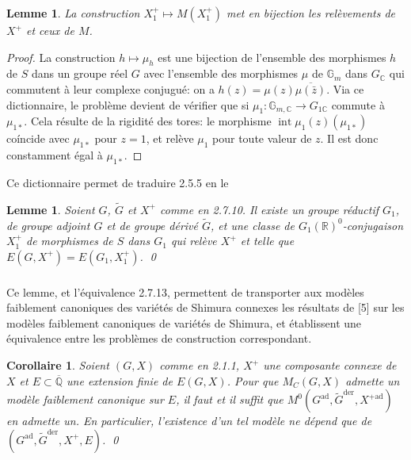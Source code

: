 \documentclass[12pt,a4paper]{article}
\theoremstyle{plain}
\newtheorem{lemma}[theorem]{Lemme}
\newtheorem{corollary}[theorem]{Corollaire}
\theoremstyle{definition}
\theoremstyle{remark}
\DeclareMathOperator{\Int}{int}
\newcommand{\QQ}{\mathbb{Q}}
\newcommand{\RR}{\mathbb{R}}
\newcommand{\CC}{\mathbb{C}}
\newcommand{\Gm}{\mathbb{G}}
\begin{document}
\begin{lemma}
La construction $X_1^+ \mapsto M(X_1^+)$ met en bijection les rel\`evements de $X^+$ et ceux de $M$.
\end{lemma}

\begin{proof}
La construction $h \mapsto \mu_h$ est une bijection de l'ensemble des morphismes $h$ de $S$ dans un groupe r\'eel $G$ avec l'ensemble des morphismes $\mu$ de $\Gm_m$ dans $G_{\CC}$ qui commutent \`a leur complexe conjugu\'e: on a $h(z) = \mu(z)\overline{\mu(\bar{z})}$. Via ce dictionnaire, le probl\`eme devient de v\'erifier que si $\mu_1: \Gm_{m,\CC} \to G_{1\CC}$ commute \`a $\mu_{1*}$. Cela r\'esulte de la rigidit\'e des tores: le morphisme $\Int\mu_1(z)(\mu_{1*})$ co\'incide avec $\mu_{1*}$ pour $z=1$, et rel\`eve $\mu_1$ pour toute valeur de $z$. Il est donc constamment \'egal \`a $\mu_{1*}$.
\end{proof}

Ce dictionnaire permet de traduire 2.5.5 en le

\begin{lemma}
Soient $G$, $\tilde{G}$ et $X^+$ comme en 2.7.10. Il existe un groupe r\'eductif $G_1$, de groupe adjoint $G$ et de groupe d\'eriv\'e $\tilde{G}$, et une classe de $G_1(\RR)^0$-conjugaison $X_1^+$ de morphismes de $S$ dans $G_1$ qui rel\`eve $X^+$ et telle que $E(G,X^+) = E(G_1,X_1^+)$.
\qed
\end{lemma}

\subsubsection{}

Ce lemme, et l'\'equivalence 2.7.13, permettent de transporter aux mod\`eles faiblement canoniques des vari\'et\'es de Shimura connexes les r\'esultats de [5] sur les mod\`eles faiblement canoniques de vari\'et\'es de Shimura, et \'etablissent une \'equivalence entre les probl\`emes de construction correspondant.

\begin{corollary}
Soient $(G,X)$ comme en 2.1.1, $X^+$ une composante connexe de $X$ et $E \subset \overline{\QQ}$ une extension finie de $E(G,X)$. Pour que $M_C(G,X)$ admette un mod\`ele faiblement canonique sur $E$, il faut et il suffit que $M^0(G^{\text{ad}}, \tilde{G}^{\text{der}}, X^{+\text{ad}})$ en admette un. En particulier, l'existence d'un tel mod\`ele ne d\'epend que de $(G^{\text{ad}}, \tilde{G}^{\text{der}}, X^+, E)$.
\qed
\end{corollary}
\end{document}
